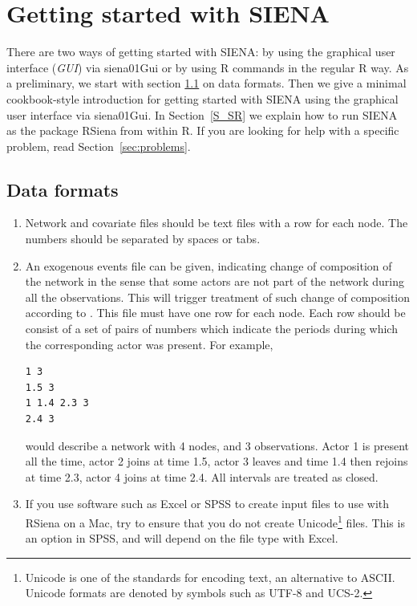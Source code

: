 \documentclass[a4paper,fleqn,11pt]{article}
\newcommand{\+}{\, + \,}
\newcommand{\R}{{\sf R }}
\newcommand{\Rn}{{\sf R}}
\newcommand{\RS}{{\sf RSiena }}
\newcommand{\SI}{{\sf SIENA }}
\newcommand{\si}{{\sf SIENA}}
\begin{document}
\section{Getting started with \SI}
\label{S_minsi1}

There are two ways of getting started with \si:
by using the  graphical user interface (\emph{GUI}) via \textsf{siena01Gui}
or by using \R commands in the regular \R way.
As a preliminary, we start with section
\ref{S_datform} on data formats.
Then we give a minimal cookbook-style
introduction for getting started with \SI using
the graphical user interface via \textsf{siena01Gui}.
In Section~\ref{S_SR}
we explain how to run \SI
as the package \RS from within \Rn.
If you are looking for help with a specific problem, read
Section~\ref{sec:problems}.


\subsection{Data formats}
\label{S_datform}

\begin{enumerate}
\item
Network and covariate files should be text files with a row for each node. The
numbers should be separated by spaces or tabs.
\item
An exogenous events file can be given, indicating change of composition of the
network in the sense that some actors are not part of the network during
all the observations.
This will trigger treatment of such change of composition
according to \citet{HuismanSnijders03}.
This file must have one row for each node.
Each row should be
consist of a set of pairs of numbers which indicate the periods
during which the corresponding actor
was present. For example,
\begin{verbatim}
1 3
1.5 3
1 1.4 2.3 3
2.4 3
\end{verbatim}
would describe a network with 4 nodes, and 3 observations. Actor 1 is present
all the time, actor 2 joins at time 1.5, actor 3 leaves and time 1.4 then
rejoins at time 2.3, actor 4 joins at time 2.4. All intervals are treated as
closed.
\item If you use software such as Excel or SPSS to create input files to use
  with \RS on a Mac, try to ensure that you do not create Unicode\footnote{Unicode
  is one of the standards for encoding text, an alternative to ASCII.
  Unicode formats are denoted by symbols such as UTF-8 and UCS-2.} files. This
  is an option in SPSS, and will depend on the file type with Excel.
\end{enumerate}
\end{document}
